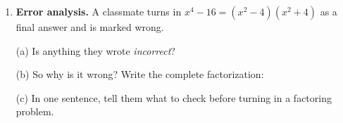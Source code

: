 \documentclass[10pt]{article}
\begin{document}
\begin{tcolorbox}[colback=white, colframe=black!40, title=\textbf{Tier A --- Approaching Proficiency},
    fonttitle=\bfseries, arc=1.5mm, left=3mm, right=3mm, top=2mm, bottom=2mm, breakable]
\begin{enumerate}[leftmargin=1.7em, itemsep=10pt]
    \vspace{2pt}
    (b) $x^3 + 27$ \quad \blank{1.6cm} \; because \blank{6.0cm}

  \item \textbf{Error analysis.} A classmate turns in $x^4 - 16 = (x^2 - 4)(x^2 + 4)$ as a final
    answer and is marked wrong.

    \vspace{2pt}
    (a) Is anything they wrote \emph{incorrect}? \blank{1.4cm}

    \vspace{2pt}
    (b) So why is it wrong? Write the complete factorization: \blank{5.0cm}

    \vspace{2pt}
    (c) In one sentence, tell them what to check before turning in a factoring problem. \writeline
\end{enumerate}
\end{tcolorbox}
\end{document}
